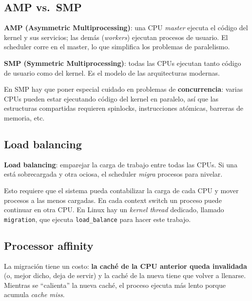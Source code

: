\documentclass[11pt,a4paper]{article}
\begin{document}
\subsection{AMP vs.\ SMP}

\begin{definicion}
\textbf{AMP (Asymmetric Multiprocessing)}: una CPU \emph{master}
ejecuta el código del kernel y sus servicios; las demás
(\emph{workers}) ejecutan procesos de usuario. El scheduler corre en
el master, lo que simplifica los problemas de paralelismo.
\end{definicion}

\begin{definicion}
\textbf{SMP (Symmetric Multiprocessing)}: todas las CPUs ejecutan
tanto código de usuario como del kernel. Es el modelo de las
arquitecturas modernas.
\end{definicion}

En SMP hay que poner especial cuidado en problemas de \textbf{concurrencia}:
varias CPUs pueden estar ejecutando código del kernel en paralelo,
así que las estructuras compartidas requieren spinlocks, instrucciones
atómicas, barreras de memoria, etc.

\subsection{Load balancing}

\begin{definicion}
\textbf{Load balancing}: emparejar la carga de trabajo entre todas
las CPUs. Si una está sobrecargada y otra ociosa, el scheduler
\emph{migra} procesos para nivelar.
\end{definicion}

Esto requiere que el sistema pueda contabilizar la carga de cada CPU
y mover procesos a las menos cargadas. En cada context switch un
proceso puede continuar en otra CPU. En Linux hay un \emph{kernel
thread} dedicado, llamado \texttt{migration}, que ejecuta
\texttt{load\_balance} para hacer este trabajo.

\subsection{Processor affinity}

La migración tiene un costo: \textbf{la caché de la CPU anterior
queda invalidada} (o, mejor dicho, deja de servir) y la caché de la
nueva tiene que volver a llenarse. Mientras se ``calienta'' la nueva
caché, el proceso ejecuta más lento porque acumula \emph{cache miss}.
\end{document}
